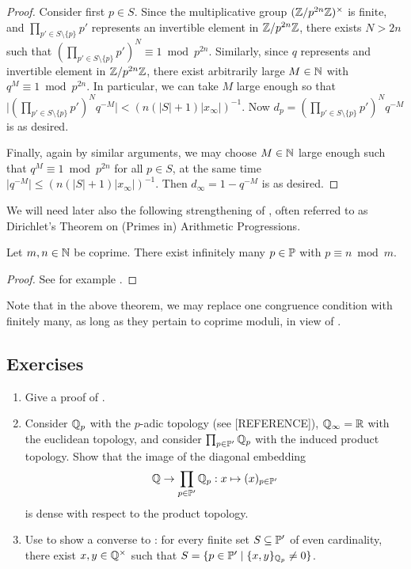 \documentclass[12pt, leqno, british]{amsart}
\begin{document}
\begin{proof}
Consider first $p \in S$.
Since the multiplicative group $(\mathbb Z/p^{2n}\mathbb Z)^\times$ is finite, and $\prod_{p' \in S \setminus \lbrace p \rbrace} p'$ represents an invertible element in $\mathbb Z/p^{2n}\mathbb Z$, there exists $N > 2n$ such that $(\prod_{p' \in S \setminus \lbrace p \rbrace} p')^N \equiv 1 \bmod p^{2n}$.
Similarly, since $q$ represents and invertible element in $\mathbb Z/p^{2n}\mathbb Z$, there exist arbitrarily large $M \in \mathbb N$ with $q^M \equiv 1 \bmod p^{2n}$.
In particular, we can take $M$ large enough so that $\lvert (\prod_{p' \in S \setminus \lbrace p \rbrace} p')^N q^{-M} \rvert < (n(\lvert S \rvert + 1)\lvert x_\infty \rvert)^{-1}$.
Now $d_p = (\prod_{p' \in S \setminus \lbrace p \rbrace} p')^N q^{-M}$ is as desired.

Finally, again by similar arguments, we may choose $M \in \mathbb N$ large enough such that $q^{M} \equiv 1 \bmod p^{2n}$ for all $p \in S$, at the same time $\lvert q^{-M} \rvert \leq (n(\lvert S \rvert + 1) \lvert x_\infty \rvert)^{-1}$.
Then $d_\infty = 1 - q^{-M}$ is as desired.
\end{proof}
We will need later also the following strengthening of , often referred to as Dirichlet's Theorem on (Primes in) Arithmetic Progressions.
\begin{thm}\label{T:Dirichlet}
Let $m, n \in \mathbb N$ be coprime.
There exist infinitely many $p \in \mathbb P$ with $p \equiv n \bmod m$.
\end{thm}
\begin{proof}
See for example \cite[Section I.10, Exercise 1]{Neu99}.
\end{proof}
Note that in the above theorem, we may replace one congruence condition with finitely many, as long as they pertain to coprime moduli, in view of .

\subsection{Exercises}
\begin{enumerate}
\item Give a proof of .
\item Consider $\mathbb Q_p$ with the $p$-adic topology (see [REFERENCE]), $\mathbb Q_{\infty} = \mathbb R$ with the euclidean topology, and consider $\prod_{p \in \mathbb P'} \mathbb Q_p$ with the induced product topology.
Show that the image of the diagonal embedding
$$ \mathbb Q \to \prod_{p \in \mathbb P'} \mathbb Q_p : x \mapsto (x)_{p \in \mathbb P'} $$
is dense with respect to the product topology.
\item Use  to show a converse to : for every finite set $S \subseteq \mathbb P'$ of even cardinality, there exist $x, y \in \mathbb Q^\times$ such that $S = \lbrace p \in \mathbb P' \mid \lbrace x, y \rbrace_{\mathbb Q_p} \neq 0 \rbrace$.
\end{enumerate}
\end{document}
